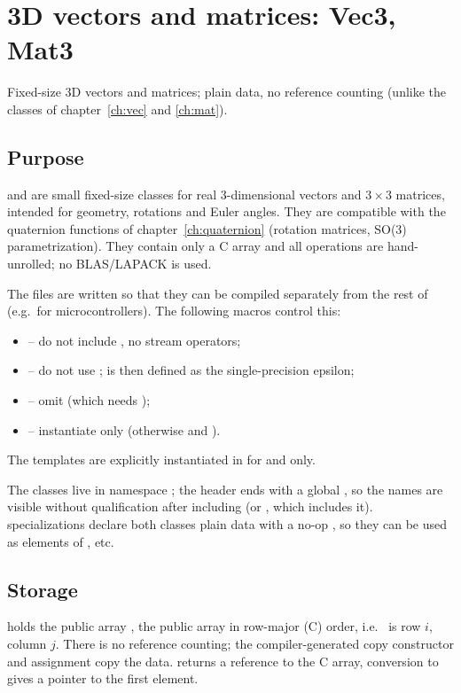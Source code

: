 \chapter{3D vectors and matrices: Vec3, Mat3}\label{ch:vecmat3}

Fixed-size 3D vectors and matrices; plain data, no reference counting (unlike the classes of chapter~\ref{ch:vec} and \ref{ch:mat}).

\section{Purpose}
 and  are small fixed-size classes for real 3-dimensional
vectors and $3\times3$ matrices, intended for geometry, rotations and Euler angles. They are
compatible with the quaternion functions of chapter~\ref{ch:quaternion}
(rotation matrices, SO(3) parametrization). They contain only a C array and all operations
are hand-unrolled; no BLAS/LAPACK is used.

The files are written so that they can be compiled separately from the rest of \LA{}
(e.g.\ for microcontrollers). The following macros control this:
\begin{itemize}
\item {} -- do not include , no stream operators;
\item {} -- do not use ; 
  is then defined as the single-precision epsilon;
\item {} -- omit  (which needs );
\item {} -- instantiate only  (otherwise  and ).
\end{itemize}
The templates are explicitly instantiated in  for  and  only.

The classes live in namespace ; the header ends with a global
, so the names are visible without qualification
after including  (or , which includes it).
 specializations declare both classes plain data with a no-op
, so they can be used as elements of ,  etc.

\section{Storage}
 holds the public array ,  the public array
 in row-major (C) order, i.e.\  is row $i$, column $j$.
There is no reference counting; the compiler-generated copy constructor and assignment
copy the data.  returns a reference to the C array, conversion to 
gives a pointer to the first element.

